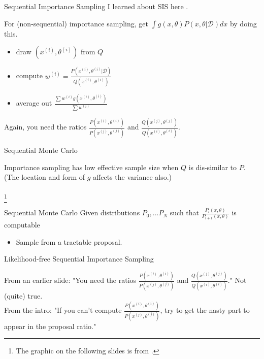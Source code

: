\documentclass[12pt,a4paper,t,xcolor=dvipsnames,slidestop,compress,mathserif]{beamer}
\begin{document}
\begin{frame}{Sequential Importance Sampling}
I learned about SIS here \cite{SMC_Doucet_Freitas_Gordon}.

For (non-sequential) importance sampling, get $\int g(x, \theta)P(x, \theta|\mathcal{D})dx$ by doing this.
\begin{itemize}
\item draw $(x^{(i)}, \theta^{(i)})$ from $Q$
\item compute $w^{(i)}=\frac{P(x^{(i)}, \theta^{(i)}|\mathcal{D})}{Q(x^{(i)}, \theta^{(i)})}$
\item average out $\frac{\sum w^{(i)}g(x^{(i)}, \theta^{(i)})}{\sum w^{(i)}}$
\end{itemize}

Again, you need the ratios $\frac{P(x^{(i)}, \theta^{(i)})}{P(x^{(j)}, \theta^{(j)})} $ and
$ \frac{Q(x^{(j)}, \theta^{(j)})}{Q(x^{(i)}, \theta^{(i)})}$.

\end{frame}

\begin{frame}{Sequential Monte Carlo}

Importance sampling has low effective sample size when $Q$ is dis-similar to $P$. (The location and form of $g$ affects the variance also.)\\

\\

\footnote{The graphic on the following slides is from \cite{FinkeSMCslides}.}
\end{frame}



\begin{frame}{Sequential Monte Carlo}
Given distributions $P_0, ... P_N$ such that $\frac{P_i(x, \theta)}{P_{i+1}(x, \theta)}$ is computable
\begin{itemize}
\item Sample from a tractable proposal. 
\end{itemize}

\end{frame}


\begin{frame}{Likelihood-free Sequential Importance Sampling}

From an earlier slide: "You need the ratios $\frac{P(x^{(i)}, \theta^{(i)})}{P(x^{(j)}, \theta^{(j)})} $ and
$ \frac{Q(x^{(j)}, \theta^{(j)})}{Q(x^{(i)}, \theta^{(i)})}$." Not (quite) true.\\

From the intro: "If you can't compute $\frac{P(x^{(i)}, \theta^{(i)})}{P(x^{(j)}, \theta^{(j)})} $, try to get the nasty part to appear in the proposal ratio."

\end{frame}
\end{document}
